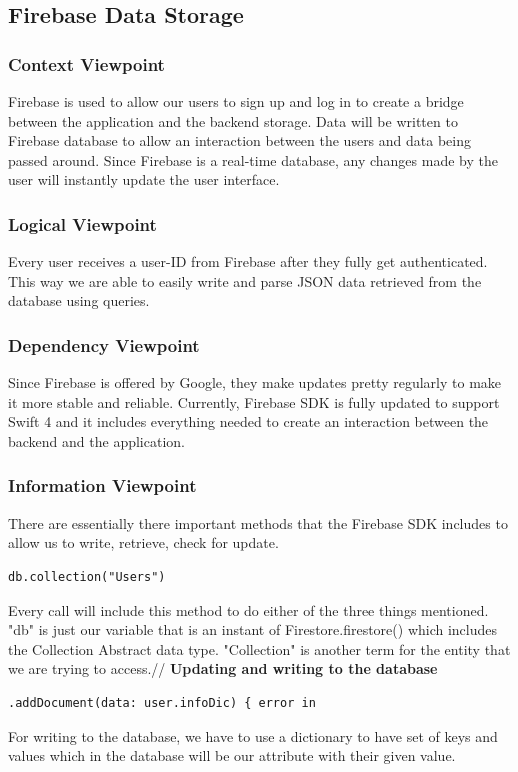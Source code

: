 \documentclass[onecolumn, draftclsnofoot,10pt, compsoc]{IEEEtran}
\begin{document}
\subsection{Firebase Data Storage}
\subsubsection{Context Viewpoint}
Firebase is used to allow our users to sign up and log in to create a bridge between the application and the backend storage. Data will be written to Firebase database to allow an interaction between the users and data being passed around. Since Firebase is a real-time database, any changes made by the user will instantly update the user interface.

\subsubsection{Logical Viewpoint}
Every user receives a user-ID from Firebase after they fully get authenticated. This way we are able to easily write and parse JSON data retrieved from the database using queries.

\subsubsection{Dependency Viewpoint}
Since Firebase is offered by Google, they make updates pretty regularly to make it more stable and reliable. Currently, Firebase SDK is fully updated to support Swift 4 and it includes everything needed to create an interaction between the backend and the application.
\subsubsection{Information Viewpoint}
There are essentially there important methods that the Firebase SDK includes to allow us to write, retrieve, check for update.
\begin{lstlisting}
db.collection("Users")
\end{lstlisting}
Every call will include this method to do either of the three things mentioned. "db" is just our variable that is an instant of Firestore.firestore()  which includes the Collection Abstract data type. "Collection" is another term for the entity that we are trying to access.//
\noindent\textbf{Updating and writing to the database}
\begin{lstlisting}
.addDocument(data: user.infoDic) { error in
\end{lstlisting}
For writing to the database, we have to use a dictionary to have set of keys and values which in the database will be our attribute with their given value.
\end{document}
